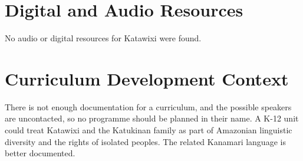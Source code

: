 \documentclass[12pt]{article}
\begin{document}
\section{Digital and Audio Resources}
No audio or digital resources for Katawixi were found.

\section{Curriculum Development Context}
There is not enough documentation for a curriculum, and the possible speakers are uncontacted, so no programme should be planned in their name. A K-12 unit could treat Katawixi and the Katukinan family as part of Amazonian linguistic diversity and the rights of isolated peoples. The related Kanamari language is better documented.
\end{document}
